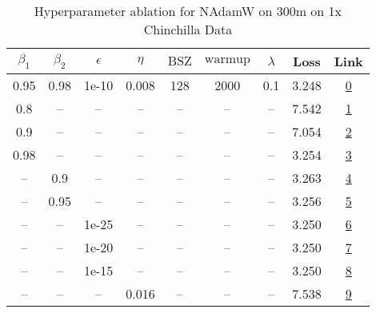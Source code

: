 \begin{table}[H]
\centering
\caption{Hyperparameter ablation for NAdamW on 300m on 1x Chinchilla Data}
\label{tab:ablation_nadamw_300m_1}
\begin{tabular}{ccccccccc}
\toprule
$\beta_1$ & $\beta_2$ & $\epsilon$ & $\eta$ & $\mathrm{BSZ}$ & $\mathrm{warmup}$ & $\lambda$ & Loss & Link \\
\midrule
0.95 & 0.98 & 1e-10 & 0.008 & 128 & 2000 & 0.1 & 3.248 & \href{https://wandb.ai/stanford-mercury/optimizer-scaling/runs/sweep-300m-6B-nadamwf15cf6lr0.008-wd0.1-minlr0-warmup2000-b10.95-28ca3a}{0} \\
\midrule
0.8 & -- & -- & -- & -- & -- & -- & 7.542 & \href{https://wandb.ai/stanford-mercury/optimizer-scaling/runs/sweep-300m-6B-nadamw0ba9cdlr0.008-wd0.1-minlr0-warmup2000-b10.8--70e8b0}{1} \\
0.9 & -- & -- & -- & -- & -- & -- & 7.054 & \href{https://wandb.ai/stanford-mercury/optimizer-scaling/runs/sweep-300m-6B-nadamwacb766lr0.008-wd0.1-minlr0-warmup2000-b10.9--ff6a2e}{2} \\
0.98 & -- & -- & -- & -- & -- & -- & 3.254 & \href{https://wandb.ai/stanford-mercury/optimizer-scaling/runs/sweep-300m-6B-nadamwd6541dlr0.008-wd0.1-minlr0-warmup2000-b10.98-84afaa}{3} \\
-- & 0.9 & -- & -- & -- & -- & -- & 3.263 & \href{https://wandb.ai/stanford-mercury/optimizer-scaling/runs/sweep-300m-6B-nadamw6046ddlr0.008-wd0.1-minlr0-warmup2000-b10.95-127527}{4} \\
-- & 0.95 & -- & -- & -- & -- & -- & 3.256 & \href{https://wandb.ai/stanford-mercury/optimizer-scaling/runs/sweep-300m-6B-nadamwc2a8e4lr0.008-wd0.1-minlr0-warmup2000-b10.95-3a5d38}{5} \\
-- & -- & 1e-25 & -- & -- & -- & -- & 3.250 & \href{https://wandb.ai/stanford-mercury/optimizer-scaling/runs/sweep-300m-6B-nadamwb27e94lr0.008-wd0.1-minlr0-warmup2000-b10.95-4bf48d}{6} \\
-- & -- & 1e-20 & -- & -- & -- & -- & 3.250 & \href{https://wandb.ai/stanford-mercury/optimizer-scaling/runs/sweep-300m-6B-nadamw43c706lr0.008-wd0.1-minlr0-warmup2000-b10.95-bf751b}{7} \\
-- & -- & 1e-15 & -- & -- & -- & -- & 3.250 & \href{https://wandb.ai/stanford-mercury/optimizer-scaling/runs/sweep-300m-6B-nadamw770e16lr0.008-wd0.1-minlr0-warmup2000-b10.95-126b23}{8} \\
-- & -- & -- & 0.016 & -- & -- & -- & 7.538 & \href{https://wandb.ai/stanford-mercury/optimizer-scaling/runs/sweep-300m-6B-nadamwb4c393lr0.016-wd0.1-minlr0-warmup2000-b10.95-ea7a28}{9} \\

\end{tabular}
\end{table}
